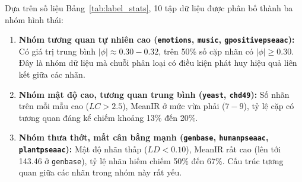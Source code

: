 \documentclass[11pt,a4paper]{article}
\begin{document}
\begin{table}[htbp]
\centering
\caption{\textbf{Đặc trưng cấu trúc không gian mẫu, nhãn và tương quan của 10 tập dữ liệu benchmark.}}
\label{tab:label_stats}
\end{table}

Dựa trên số liệu Bảng~\ref{tab:label_stats}, 10 tập dữ liệu được phân bố thành ba nhóm hình thái:
\begin{enumerate}[leftmargin=*]
  \item \textbf{Nhóm tương quan tự nhiên cao (\texttt{emotions}, \texttt{music}, \texttt{gpositivepseaac}):} Có giá trị trung bình $|\phi| \approx 0.30 - 0.32$, trên 50\% số cặp nhãn có $|\phi| \ge 0.30$. Đây là nhóm dữ liệu mà chuỗi phân loại có điều kiện phát huy hiệu quả liên kết giữa các nhãn.
  \item \textbf{Nhóm mật độ cao, tương quan trung bình (\texttt{yeast}, \texttt{chd49}):} Số nhãn trên mỗi mẫu cao ($LC > 2.5$), MeanIR ở mức vừa phải ($7 - 9$), tỷ lệ cặp có tương quan đáng kể chiếm khoảng 13\% đến 20\%.
  \item \textbf{Nhóm thưa thớt, mất cân bằng mạnh (\texttt{genbase}, \texttt{humanpseaac}, \texttt{plantpseaac}):} Mật độ nhãn thấp ($LD < 0.10$), MeanIR rất cao (lên tới 143.46 ở \texttt{genbase}), tỷ lệ nhãn hiếm chiếm 50\% đến 67\%. Cấu trúc tương quan giữa các nhãn trong nhóm này rất yếu.
\end{enumerate}
\end{document}
